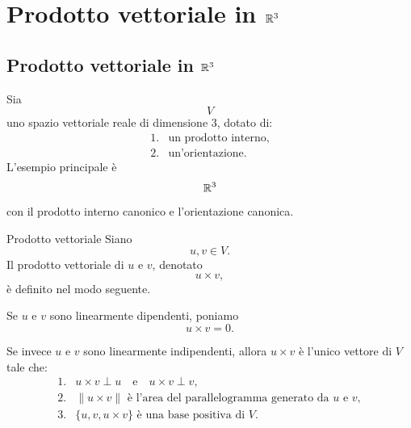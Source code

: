 \documentclass[a4paper]{article}
\begin{document}
\section{Prodotto vettoriale in \(\mathbb{R}^3\)}

\subsection{Prodotto vettoriale in \(\mathbb{R}^3\)}

Sia
\[
    V
\]
uno spazio vettoriale reale di dimensione \(3\), dotato di:
\[
    \begin{array}{ll}
        \text{1.} & \text{un prodotto interno},\\
        \text{2.} & \text{un'orientazione}.
    \end{array}
\]
L'esempio principale è
\[
    \mathbb{R}^3
\]
con il prodotto interno canonico e l'orientazione canonica.

\begin{snippetdefinition}{Prodotto vettoriale}
    Siano
    \[
        u,v\in V.
    \]
    Il prodotto vettoriale di \(u\) e \(v\), denotato
    \[
        u\times v,
    \]
    è definito nel modo seguente.

    Se \(u\) e \(v\) sono linearmente dipendenti, poniamo
    \[
        u\times v=0.
    \]

    Se invece \(u\) e \(v\) sono linearmente indipendenti, allora \(u\times v\) è l'unico vettore di \(V\) tale che:
    \[
        \begin{array}{ll}
            \text{1.} & u\times v \perp u
            \quad\text{e}\quad
            u\times v\perp v,\\[1mm]
            \text{2.} & \|u\times v\|
            \text{ è l'area del parallelogramma generato da }u\text{ e }v,\\[1mm]
            \text{3.} & \{u,v,u\times v\}
            \text{ è una base positiva di }V.
        \end{array}
    \]
\end{snippetdefinition}

\begin{center}
\end{center}
\end{document}
